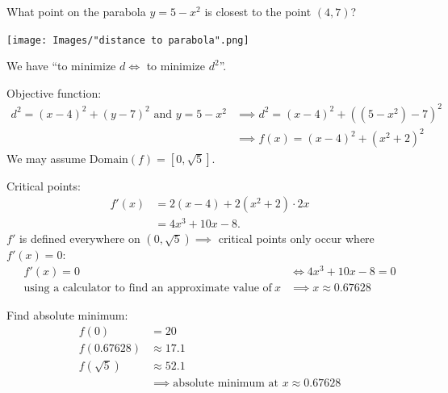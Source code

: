 \documentclass[nooutcomes]{ximera}
\begin{document}
\begin{problem}
  What point on the parabola $y=5-x^2$ is closest to the point $(4,7)$?
  \begin{freeResponse}
    \begin{image}
      \texttt{[image: Images/"distance to parabola".png]}
    \end{image}

    We have ``to minimize $d \iff$ to minimize $d^2$''.

    Objective function:
    \begin{align*}
      d^2 = (x-4)^2 + (y-7)^2 \mbox{ and } y = 5 - x^2 &\implies d^2 = (x-4)^2 + \left((5 - x^2) -7 \right)^2\\
      &\implies f(x) = (x-4)^2 + (x^2 + 2)^2
    \end{align*}
    We may assume $\mbox{Domain}(f) = [0, \sqrt{5}]$.

    Critical points:
    \begin{align*}
      f'(x) &= 2(x-4) + 2(x^2 + 2) \cdot 2x\\
      &= 4x^3 + 10x - 8.
    \end{align*}
    $f'$ is defined everywhere on $(0, \sqrt{5}) \implies$ critical points only occur where $f'(x) = 0$:
    \begin{align*}
      f'(x) = 0 &\iff 4x^3 + 10x - 8 = 0\\
     \text{using a calculator to find an approximate value of}\ x &\implies x \approx 0.67628 
    \end{align*}

    Find absolute minimum:
    \begin{align*}
      f(0) &= 20\\
      f(0.67628) &\approx 17.1\\
      f(\sqrt{5}) &\approx 52.1\\
      &\implies \mbox{absolute minimum at $x \approx 0.67628$}
    \end{align*}
  \end{freeResponse}
\end{problem}
\end{document}
